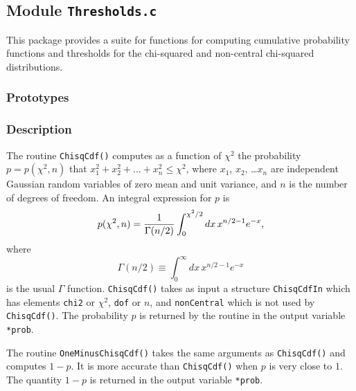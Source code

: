 \newpage
\subsection{Module \texttt{Thresholds.c}}
\label{ss:Thresholds.c}

This package provides a suite for functions for computing cumulative
probability functions and thresholds for the chi-squared and
non-central chi-squared distributions.

\subsubsection*{Prototypes}
\vspace{0.1in}






\subsubsection*{Description}

The routine \verb+ChisqCdf()+ computes as a function of $\chi^2$ the
probability $p = p(\chi^2,n)$ that $x_1^2 + x_2^2 + \ldots + x_n^2 \le \chi^2$,
where $x_1$, $x_2$, \ldots $x_n$ are independent Gaussian random
variables of zero mean and unit variance, and $n$ is the number of
degrees of freedom.  An integral expression for $p$ is
$$
p(\chi^2,n) = {1 \over \Gamma(n/2)} \int_0^{\chi^2/2} dx \, x^{n/2-1} e^{-x},
$$
where 
$$
\Gamma(n/2) \equiv \int_0^\infty dx \, x^{n/2-1} e^{-x}
$$
is the usual $\Gamma$ function.  \verb+ChisqCdf()+ takes as input a
structure \verb+ChisqCdfIn+ which has elements \verb+chi2+ or
$\chi^2$, \verb+dof+ or $n$, and \verb+nonCentral+ which is not used
by \verb+ChisqCdf()+.  The probability $p$ is returned by the routine 
in the output variable \verb+*prob+.


The routine \verb+OneMinusChisqCdf()+ takes the same arguments as
\verb+ChisqCdf()+ and computes $1-p$.  It is more accurate than
\verb+ChisqCdf()+ when $p$ is very close to $1$.  The quantity $1-p$
is returned in the output variable \verb+*prob+.


